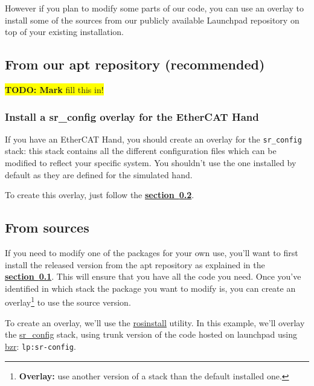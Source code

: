 \documentclass[12pt]{article}
\newcommand{\todo}[1]{\colorbox{yellow}{\textbf{TODO: #1} fill this in!}}
\newcommand{\link}[1]{\hyperref[sec:#1]{\textbf{section~\ref*{sec:#1}}}}
\begin{document}
\par However if you plan to modify some parts of our code, you can use an overlay to install some of the sources from our publicly available Launchpad repository on top of your existing installation.

\subsection{From our apt repository (recommended)}
\label{sec:install-apt}
\todo{Mark}

\subsubsection{Install a sr\_config overlay for the EtherCAT Hand}
\label{sec:install-cfg}
\par If you have an EtherCAT Hand, you should create an overlay for the \texttt{sr\_config} stack: this stack contains all the different configuration files which can be modified to reflect your specific system. You shouldn't use the one installed by default as they are defined for the simulated hand.

\par To create this overlay, just follow the \link{install-src}.

\subsection{From sources}
\label{sec:install-src}
\par If you need to modify one of the packages for your own use, you'll want to first install the released version from the apt repository as explained in the \link{install-apt}. This will ensure that you have all the code you need. Once you've identified in which stack the package you want to modify is, you can create an overlay\footnote{\textbf{Overlay:} use another version of a stack than the default installed one.} to use the source version.

\par To create an overlay, we'll use the \href{http://ros.org/wiki/rosinstall}{rosinstall} utility. In this example, we'll overlay the \href{http://launchpad.net/sr-config}{sr\_config} stack, using trunk version of the code hosted on launchpad using \href{http://bazaar.canonical.com}{bzr}: \texttt{lp:sr-config}.
\end{document}

